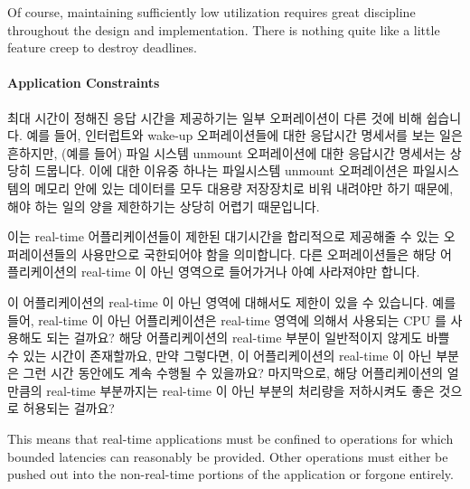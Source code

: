 Of course, maintaining sufficiently low utilization requires great
discipline throughout the design and implementation.
There is nothing quite like a little feature creep to destroy deadlines.
\fi

\paragraph{Application Constraints}
\label{sec:advsync:Application Constraints}

최대 시간이 정해진 응답 시간을 제공하기는 일부 오퍼레이션이 다른 것에 비해
쉽습니다.
예를 들어, 인터럽트와 wake-up 오퍼레이션들에 대한 응답시간 명세서를 보는 일은
흔하지만, (예를 들어) 파일 시스템 unmount 오퍼레이션에 대한 응답시간 명세서는
상당히 드뭅니다.
이에 대한 이유중 하나는 파일시스템 unmount 오퍼레이션은 파일시스템의 메모리
안에 있는 데이터를 모두 대용량 저장장치로 비워 내려야만 하기 때문에, 해야 하는
일의 양을 제한하기는 상당히 어렵기 때문입니다.

이는 real-time 어플리케이션들이 제한된 대기시간을 합리적으로 제공해줄 수 있는
오퍼레이션들의 사용만으로 국한되어야 함을 의미합니다.
다른 오퍼레이션들은 해당 어플리케이션의 real-time 이 아닌 영역으로 들어가거나
아예 사라져야만 합니다.

이 어플리케이션의 real-time 이 아닌 영역에 대해서도 제한이 있을 수 있습니다.
예를 들어, real-time 이 아닌 어플리케이션은 real-time 영역에 의해서 사용되는
CPU 를 사용해도 되는 걸까요?
해당 어플리케이션의 real-time 부분이 일반적이지 않게도 바쁠 수 있는 시간이
존재할까요, 만약 그렇다면, 이 어플리케이션의 real-time 이 아닌 부분은 그런 시간
동안에도 계속 수행될 수 있을까요?
마지막으로, 해당 어플리케이션의 얼만큼의 real-time 부분까지는 real-time 이 아닌
부분의 처리량을 저하시켜도 좋은 것으로 허용되는 걸까요?
\iffalse

This means that real-time applications must be confined to operations
for which bounded latencies can reasonably be provided.
Other operations must either be pushed out into the non-real-time portions
of the application or forgone entirely.

